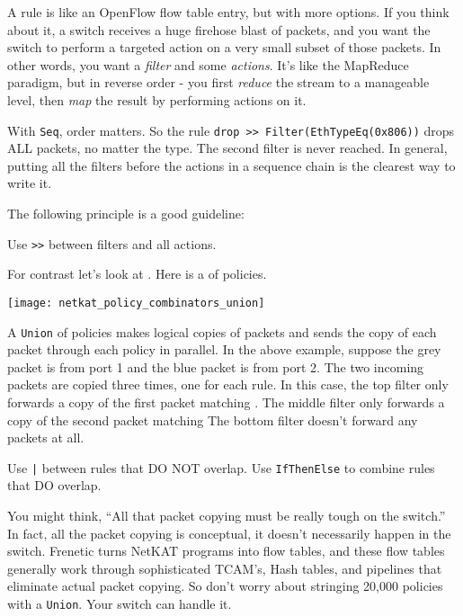 A rule is like an OpenFlow flow table entry, but with more options.  
If you think about it, a switch receives a huge firehose blast of packets, and you want the switch to 
perform a targeted action on a very small subset of those packets. 
In other words, you want a \emph{filter} and some \emph{actions}.
It's like the MapReduce paradigm, but in reverse order - you first \emph{reduce} the stream to a manageable level,
then \emph{map} the result by performing actions on it.  

With \texttt{Seq}, order matters.  So the rule \texttt{drop >> Filter(EthTypeEq(0x806))} 
drops ALL packets, no matter the type.  
The second filter is never reached.  
In general, putting all the filters before the actions in a sequence chain is the clearest way to write it.

The following principle is a good guideline:  

\begin{principle}
Use \texttt{>>} between filters and all actions.
\end{principle}

For contrast let's look at .  Here is a  of policies.

\texttt{[image: netkat\_policy\_combinators\_union]}

A \texttt{Union} of policies makes logical copies of packets and sends the copy of each packet
through each policy in parallel.  In the above example, suppose the grey packet is from port 1 and the
blue packet is from port 2.  The two incoming packets are copied three times, one
for each rule.  In this case, the top filter only forwards a copy of the first packet matching .
The middle filter only forwards a copy of the second packet  matching 
The bottom filter doesn't forward any packets at all.  

\begin{principle}
Use \texttt{|} between rules that DO NOT overlap.
Use \texttt{IfThenElse} to combine rules that DO overlap. 
\end{principle}

You might think, ``All that packet copying must be really tough on the switch.''  In fact, all the 
packet copying is conceptual, it doesn't necessarily happen in the switch.  Frenetic turns NetKAT
programs into flow tables, and these flow tables generally work through sophisticated TCAM's, Hash tables,
and pipelines that eliminate actual packet copying.  So don't worry about stringing 20,000 policies
with a \texttt{Union}.  Your switch can handle it.   


